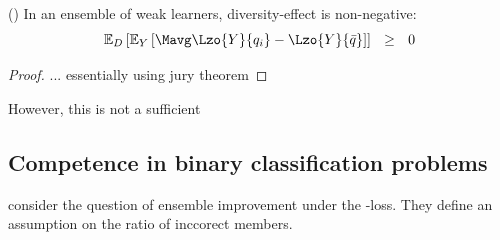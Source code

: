 \documentclass[../main.tex]{subfiles}
\begin{document}
\begin{theorem} 
    \label{thm:weak-learner-ensembles-nonnegative}
    (\cite{wood_UnifiedTheoryDiversity_2023}) In an ensemble of weak learners, diversity-effect is non-negative:
$$
\mathbb{E}_{D}\left[ 
\mathbb{E}_{Y}\left[ 
\Mavg \Lzo{Y}{q_{i}} - \Lzo{Y}{\bar{q}}
\right] 
\right] 
~ ~ \geq ~ ~ 0
$$
\end{theorem}
\begin{proof}
... essentially using jury theorem
\end{proof}


However, this is not a sufficient 
%

\subsection{Competence in binary classification problems}

\citeauthor{theisen_WhenAreEnsembles_2023} consider the question of ensemble improvement under the \zeroone-loss. They define an assumption on the ratio of inccorect members.
\end{document}
